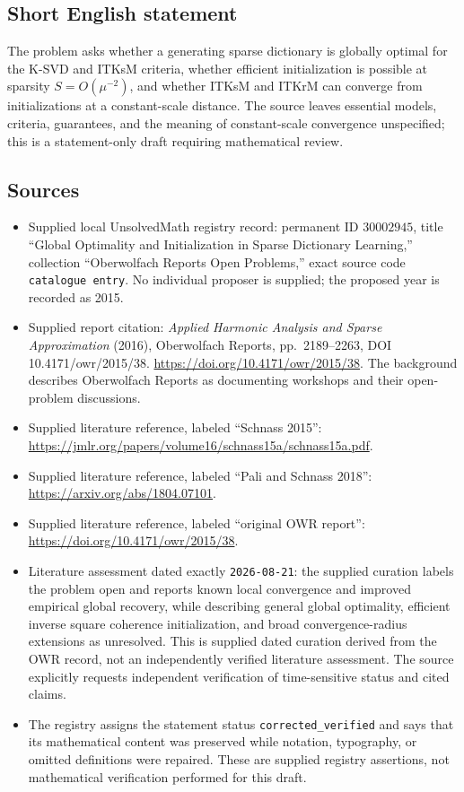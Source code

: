 \documentclass[11pt]{article}
\begin{document}
\subsection{Short English statement}
The problem asks whether a generating sparse dictionary is globally optimal for the K-SVD and ITKsM criteria, whether efficient initialization is possible at sparsity \(S=O(\mu^{-2})\), and whether ITKsM and ITKrM can converge from initializations at a constant-scale distance. The source leaves essential models, criteria, guarantees, and the meaning of constant-scale convergence unspecified; this is a statement-only draft requiring mathematical review.
\subsection{Sources}
\begin{itemize}
\item Supplied local UnsolvedMath registry record: permanent ID \(30002945\), title ``Global Optimality and Initialization in Sparse Dictionary Learning,'' collection ``Oberwolfach Reports Open Problems,'' exact source code \texttt{catalogue entry}. No individual proposer is supplied; the proposed year is recorded as 2015.
\item Supplied report citation: \emph{Applied Harmonic Analysis and Sparse Approximation} (2016), Oberwolfach Reports, pp.\ 2189--2263, DOI 10.4171/owr/2015/38. \url{https://doi.org/10.4171/owr/2015/38}. The background describes Oberwolfach Reports as documenting workshops and their open-problem discussions.
\item Supplied literature reference, labeled ``Schnass 2015'': \url{https://jmlr.org/papers/volume16/schnass15a/schnass15a.pdf}.
\item Supplied literature reference, labeled ``Pali and Schnass 2018'': \url{https://arxiv.org/abs/1804.07101}.
\item Supplied literature reference, labeled ``original OWR report'': \url{https://doi.org/10.4171/owr/2015/38}.
\item Literature assessment dated exactly \texttt{2026-08-21}: the supplied curation labels the problem open and reports known local convergence and improved empirical global recovery, while describing general global optimality, efficient inverse square coherence initialization, and broad convergence-radius extensions as unresolved. This is supplied dated curation derived from the OWR record, not an independently verified literature assessment. The source explicitly requests independent verification of time-sensitive status and cited claims.
\item The registry assigns the statement status \texttt{corrected\_verified} and says that its mathematical content was preserved while notation, typography, or omitted definitions were repaired. These are supplied registry assertions, not mathematical verification performed for this draft.
\end{itemize}
\end{document}
